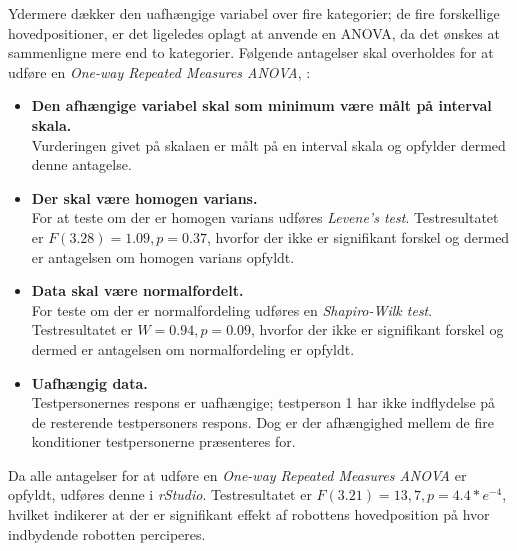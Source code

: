 Ydermere dækker den uafhængige variabel over fire kategorier; de fire forskellige hovedpositioner, er det ligeledes oplagt at anvende en ANOVA, da det ønskes at sammenligne mere end to kategorier.\blankline
%
Følgende antagelser skal overholdes for at udføre en \textit{One-way Repeated Measures ANOVA}, \parencite[ss. 575-577]{DiscoveringStatisticsUsingR}: \blankline  
%
\begin{itemize}
	\item \textbf{Den afhængige variabel skal som minimum være målt på interval skala.}\\
	Vurderingen givet på skalaen er målt på en interval skala og opfylder dermed denne antagelse.
	\item \textbf{Der skal være homogen varians. }\\
	For at teste om der er homogen varians udføres \textit{Levene's test}. Testresultatet er $F(3.28)=1.09, p=0.37$, hvorfor der ikke er signifikant forskel og dermed er antagelsen om homogen varians opfyldt. 
	\item \textbf{Data skal være normalfordelt.}\\
	For teste om der er normalfordeling udføres en \textit{Shapiro-Wilk test}. Testresultatet er $W=0.94, p=0.09$, hvorfor der ikke er signifikant forskel og dermed er antagelsen om normalfordeling er opfyldt.
	\item \textbf{Uafhængig data.}\\
	Testpersonernes respons er uafhængige; testperson 1 har ikke indflydelse på de resterende testpersoners respons. Dog er der afhængighed mellem de fire konditioner testpersonerne præsenteres for.\blankline
\end{itemize}
\noindent
%
Da alle antagelser for at udføre en \textit{One-way Repeated Measures ANOVA} er opfyldt, udføres denne i \textit{rStudio}. Testresultatet er $F(3.21)=13,7, p=4.4*e^{-4}$, hvilket indikerer at der er signifikant effekt af robottens hovedposition på hvor indbydende robotten perciperes.

